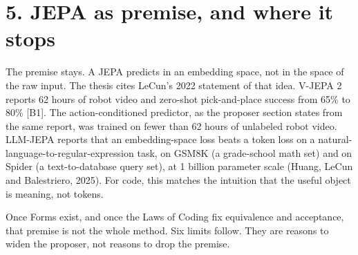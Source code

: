 \documentclass[10pt,letterpaper]{article}
\begin{document}
\section{5. JEPA as premise, and where it
stops}\label{jepa-as-premise-and-where-it-stops}

The premise stays. A JEPA predicts in an embedding space, not in the
space of the raw input. The thesis cites LeCun's 2022 statement of that
idea. V-JEPA 2 reports 62 hours of robot video and zero-shot
pick-and-place success from 65\% to 80\% {[}B1{]}. The
action-conditioned predictor, as the proposer section states from the
same report, was trained on fewer than 62 hours of unlabeled robot
video. LLM-JEPA reports that an embedding-space loss beats a token loss
on a natural-language-to-regular-expression task, on GSM8K (a
grade-school math set) and on Spider (a text-to-database query set), at
1 billion parameter scale (Huang, LeCun and Balestriero, 2025). For
code, this matches the intuition that the useful object is meaning, not
tokens.

Once Forms exist, and once the Laws of Coding fix equivalence and
acceptance, that premise is not the whole method. Six limits follow.
They are reasons to widen the proposer, not reasons to drop the premise.
\end{document}
